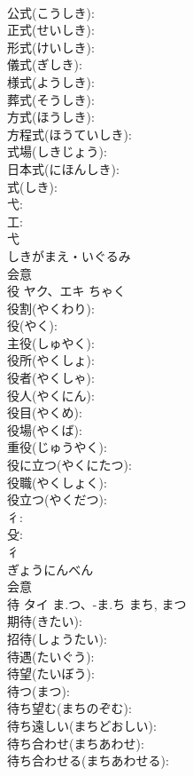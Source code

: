 \documentclass[8pt]{extreport}
\begin{document}
\begin{CJK}{UTF8}{min}
\\	公式(こうしき): 
\\	正式(せいしき): 
\\	形式(けいしき): 
\\	儀式(ぎしき): 
\\	様式(ようしき): 
\\	葬式(そうしき): 
\\	方式(ほうしき): 
\\	方程式(ほうていしき): 
\\	式場(しきじょう): 
\\	日本式(にほんしき): 
\\	式(しき): 
\\	弋: 
\\	工: 
\\	弋	
\\	しきがまえ・いぐるみ	
\\	会意 
\\	役	ヤク、エキ		ちゃく	
\\	役割(やくわり): 
\\	役(やく): 
\\	主役(しゅやく): 
\\	役所(やくしょ): 
\\	役者(やくしゃ): 
\\	役人(やくにん): 
\\	役目(やくめ): 
\\	役場(やくば): 
\\	重役(じゅうやく): 
\\	役に立つ(やくにたつ): 
\\	役職(やくしょく): 
\\	役立つ(やくだつ): 
\\	彳: 
\\	殳: 
\\	彳	
\\	ぎょうにんべん	
\\	会意 
\\	待	タイ	ま.つ、-ま.ち	まち, まつ	
\\	期待(きたい): 
\\	招待(しょうたい): 
\\	待遇(たいぐう): 
\\	待望(たいぼう): 
\\	待つ(まつ): 
\\	待ち望む(まちのぞむ): 
\\	待ち遠しい(まちどおしい): 
\\	待ち合わせ(まちあわせ): 
\\	待ち合わせる(まちあわせる): 

\end{CJK}
\end{document}
